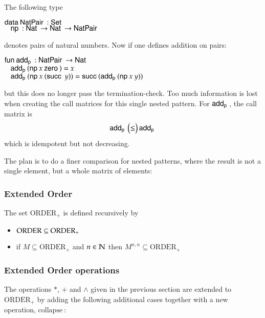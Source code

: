 The following type
\begin{bsp}
$\mathsf{data}\: \mathsf{NatPair}\: : \mathsf{Set}$\\
$\hspace*{3mm} \mathsf{np}\: : \mathsf{Nat}\: \rightarrow \mathsf{Nat}\: \rightarrow \mathsf{NatPair}\: $
\end{bsp}
denotes pairs of natural numbers. Now if one defines addition on pairs:
\begin{bsp}
$\mathsf{fun}\: \mathsf{add_p}\: : \mathsf{NatPair}\: \rightarrow \mathsf{Nat}\:$\\
$\hspace*{3mm} \mathsf{add_p}\: (\mathsf{np}\: x \: \mathsf{zero}\:) = x$\\
$\hspace*{3mm} \mathsf{add_p}\: (\mathsf{np}\: x \: (\mathsf{succ}\: \: y)) = \mathsf{succ}\: (\mathsf{add_p}\: (\mathsf{np}\: x \: y))$
\end{bsp}
\noindent but this does no longer pass the termination-check.
Too much information is lost when creating the call matrices for this single nested pattern.
For $\mathsf{add_p}\:$, the call matrix is 
\[
\mathsf{add_p}\: \begin{pmatrix}
\leq \\
\end{pmatrix}\mathsf{add_p}\:
\]
which is idempotent but not decreasing.
\newcommand{\coll}{\mathrm{collapse}\:}

\newcommand{\opl}{\operatorname{ORDER_{+}}}

The plan is to do a finer comparison for nested patterns, where the result is not a single element, but a whole matrix of elements:
\subsubsection{Extended Order}
The set $\opl$ is defined recursively by   
\begin{itemize}
\item
$ \order \subseteq \opl$
\item
if $ M \subseteq \opl $ and $n \in \mathbb{N} $ then $M^{ n,n} \subseteq \opl$
\end{itemize}

\subsubsection{Extended Order operations}
The operations $*$, $+$ and $\wedge$ given in the previous section are extended to $\opl$ by adding the following additional cases together with a new operation, $\coll$:

